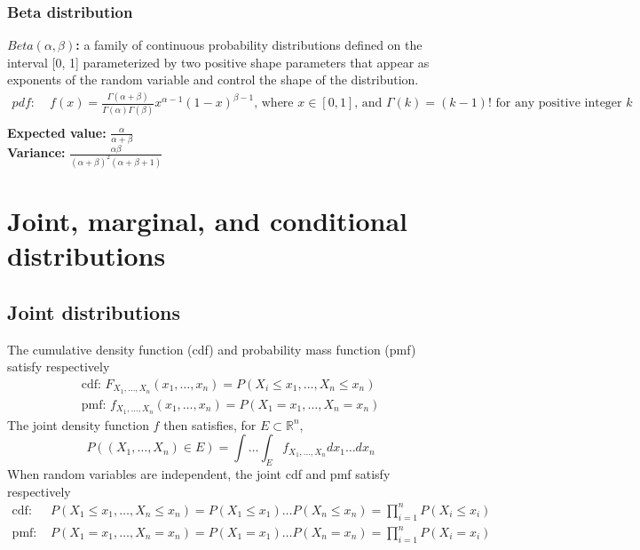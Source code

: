 \documentclass{article}
\begin{document}
\subsubsection{Beta distribution}
\textbf{$Beta(\alpha, \beta)$:} a family of continuous probability distributions defined on the interval [0, 1] parameterized by two positive shape parameters that appear as exponents of the random variable and control the shape of the distribution.
\begin{align*}
    pdf: & \; f(x) = \frac{\Gamma(\alpha + \beta)}{\Gamma(\alpha) \Gamma(\beta)} x^{\alpha - 1} (1-x)^{\beta - 1} \textrm{, where } x \in [0, 1] \textrm{, and } \Gamma(k) = (k - 1)! \textrm{ for any positive integer } k\\
\end{align*}
\textbf{Expected value:} $\frac{\alpha}{\alpha + \beta}$\\
\textbf{Variance:} $\frac{\alpha \beta}{(\alpha + \beta)^2(\alpha + \beta + 1)}$

\section{Joint, marginal, and conditional distributions}

\subsection{Joint distributions}
The cumulative density function (cdf) and probability mass function (pmf) satisfy respectively
\begin{align*}
    \textrm{cdf: } F_{X_1,\dots,X_n}(x_1, \dots, x_n) = P(X_i \leq x_1, \dots, X_n \leq x_n)\\
    \textrm{pmf: } f_{X_1,\dots,X_n}(x_1, \dots, x_n) = P(X_1=x_1, \dots, X_n = x_n)
\end{align*}
The joint density function $f$ then satisfies, for $E \subset \mathbb{R}^n$,
\begin{equation*}
    P((X_1, \dots, X_n)\in E) = \int \dots \int_E f_{X_1,\dots,X_n}dx_1\dots dx_n
\end{equation*}
When random variables are independent, the joint cdf and pmf satisfy respectively
\begin{align*}
    \textrm{cdf: } & P(X_1\leq x_1, \dots, X_n \leq x_n) = P(X_1\leq x_1)\dots P(X_n\leq x_n) = \prod_{i=1}^n P(X_i \leq x_i)\\
    \textrm{pmf: } & P(X_1= x_1, \dots, X_n = x_n) = P(X_1=x_1)\dots P(X_n=x_n) = \prod_{i=1}^nP(X_i = x_i)\\
\end{align*}
\end{document}
